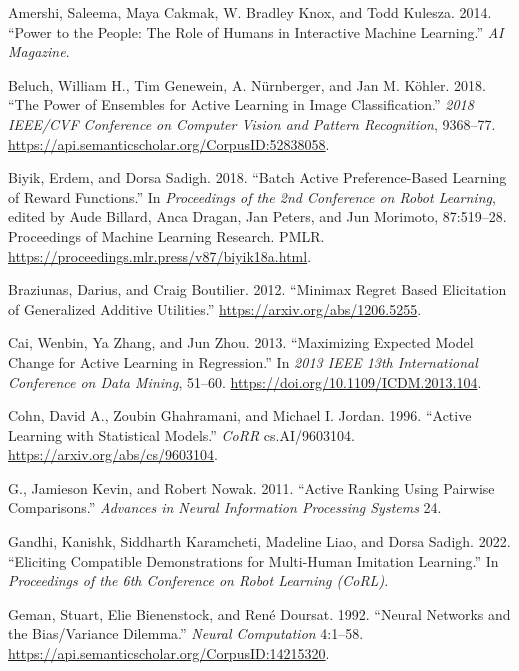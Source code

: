 \documentclass[
  letterpaper,
  numbers=noenddot,
  DIV=11]{scrreprt}
\newlength{\cslhangindent}
\newenvironment{CSLReferences}[2] %
 {\begin{list}{}{%
  \setlength{\itemindent}{0pt}
  \setlength{\leftmargin}{0pt}
  \setlength{\parsep}{0pt}
  \ifodd #1
   \setlength{\leftmargin}{\cslhangindent}
   \setlength{\itemindent}{-1\cslhangindent}
  \fi
  \setlength{\itemsep}{#2\baselineskip}}}
 {\end{list}}
\theoremstyle{plain}
\theoremstyle{definition}
\theoremstyle{remark}
\begin{document}

\label{refs-4}
\begin{CSLReferences}{1}{0}
Amershi, Saleema, Maya Cakmak, W. Bradley Knox, and Todd Kulesza. 2014.
{``Power to the People: The Role of Humans in Interactive Machine
Learning.''} \emph{AI Magazine}.

Beluch, William H., Tim Genewein, A. Nürnberger, and Jan M. Köhler.
2018. {``The Power of Ensembles for Active Learning in Image
Classification.''} \emph{2018 IEEE/CVF Conference on Computer Vision and
Pattern Recognition}, 9368--77.
\url{https://api.semanticscholar.org/CorpusID:52838058}.

Biyik, Erdem, and Dorsa Sadigh. 2018. {``Batch Active Preference-Based
Learning of Reward Functions.''} In \emph{Proceedings of the 2nd
Conference on Robot Learning}, edited by Aude Billard, Anca Dragan, Jan
Peters, and Jun Morimoto, 87:519--28. Proceedings of Machine Learning
Research. PMLR. \url{https://proceedings.mlr.press/v87/biyik18a.html}.

Braziunas, Darius, and Craig Boutilier. 2012. {``Minimax Regret Based
Elicitation of Generalized Additive Utilities.''}
\url{https://arxiv.org/abs/1206.5255}.

Cai, Wenbin, Ya Zhang, and Jun Zhou. 2013. {``Maximizing Expected Model
Change for Active Learning in Regression.''} In \emph{2013 IEEE 13th
International Conference on Data Mining}, 51--60.
\url{https://doi.org/10.1109/ICDM.2013.104}.

Cohn, David A., Zoubin Ghahramani, and Michael I. Jordan. 1996.
{``Active Learning with Statistical Models.''} \emph{CoRR}
cs.AI/9603104. \url{https://arxiv.org/abs/cs/9603104}.

G., Jamieson Kevin, and Robert Nowak. 2011. {``Active Ranking Using
Pairwise Comparisons.''} \emph{Advances in Neural Information Processing
Systems} 24.

Gandhi, Kanishk, Siddharth Karamcheti, Madeline Liao, and Dorsa Sadigh.
2022. {``Eliciting Compatible Demonstrations for Multi-Human Imitation
Learning.''} In \emph{Proceedings of the 6th Conference on Robot
Learning (CoRL)}.

Geman, Stuart, Elie Bienenstock, and René Doursat. 1992. {``Neural
Networks and the Bias/Variance Dilemma.''} \emph{Neural Computation}
4:1--58. \url{https://api.semanticscholar.org/CorpusID:14215320}.


\end{CSLReferences}
\end{document}
